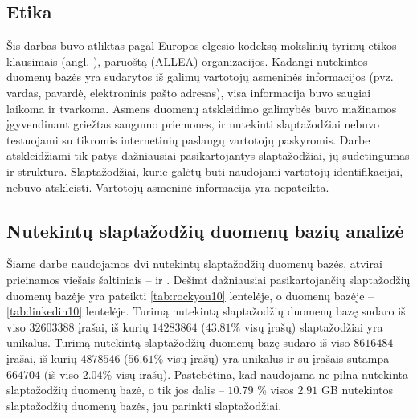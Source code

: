 \documentclass{VUMIFInfBakalaurinis}
\begin{document}
\subsection{Etika}
Šis darbas buvo atliktas pagal Europos elgesio kodeksą mokslinių tyrimų etikos 
klausimais
(angl. ), paruoštą 
 (ALLEA) 
organizacijos. Kadangi nutekintos duomenų bazės yra sudarytos iš galimų 
vartotojų asmeninės informacijos (pvz. vardas, pavardė, elektroninis pašto 
adresas), visa informacija buvo saugiai laikoma ir tvarkoma. Asmens duomenų 
atskleidimo galimybės buvo mažinamos įgyvendinant griežtas saugumo priemones, ir 
nutekinti slaptažodžiai nebuvo testuojami su tikromis internetinių paslaugų 
vartotojų paskyromis. Darbe atskleidžiami tik patys dažniausiai pasikartojantys 
slaptažodžiai, jų sudėtingumas ir struktūra. Slaptažodžiai, kurie galėtų būti 
naudojami vartotojų identifikacijai, nebuvo atskleisti. Vartotojų asmeninė 
informacija yra nepateikta.

\subsection{Nutekintų slaptažodžių duomenų bazių analizė} \label{sec:db-analize}
Šiame darbe naudojamos dvi nutekintų slaptažodžių duomenų bazės, atvirai 
prieinamos viešais šaltiniais --  \cite{RockYou} ir 
 \cite{Linkedin}. Dešimt dažniausiai pasikartojančių 
slaptažodžių duomenų bazėje  yra pateikti \ref{tab:rockyou10} 
lentelėje, o duomenų bazėje  -- \ref{tab:linkedin10} 
lentelėje. Turimą  nutekintą slaptažodžių duomenų bazę sudaro 
iš viso $32603388$ įrašai, iš kurių $14283864$ ($43.81 \%$ visų įrašų) 
slaptažodžiai yra unikalūs. Turimą  nutekintą slaptažodžių 
duomenų bazę sudaro iš viso $8616484$ įrašai, iš kurių $4878546$ ($56.61 \%$ 
visų įrašų) yra unikalūs ir su  įrašais sutampa $664704$ (iš 
viso $2.04 \%$ visų  irašų). Pastebėtina, kad naudojama ne 
pilna  nutekinta slaptažodžių duomenų bazė, o tik jos dalis 
-- $10.79$ \% visos $2.91$ GB nutekintos slaptažodžių duomenų bazės, jau 
parinkti slaptažodžiai.
\end{document}
